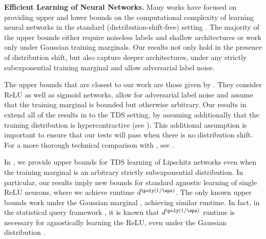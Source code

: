 \noindent\textbf{Efficient Learning of Neural Networks.} Many works have focused on providing upper and lower bounds on the computational complexity of learning neural networks in the standard (distribution-shift-free) setting \cite{reliable_goel2017,goel2019learning,goel2020superpolynomial,goel2020statistical,diakonikolas2020approximation,diakonikolas2020near,diakonikolas2020algorithms,diakonikolas2022learning,chen2022hardness,chen2022learning,chen2023learning,wang2023robustly,gollakota2024agnostically,diakonikolas2024efficiently,li2020learning,gao2019learning,zhang2019learning,vempala2019gradient,allen2019learning,bakshi2019learning,manurangsi2018computational,ge2019learning,ge2018learning,du2018convolutional,goel2018learning,tian2017analytical,li2017convergence,brutzkus2017globally,zhong2017recovery,zhang2016l1,janzamin2015beating}. The majority of the upper bounds either require noiseless labels and shallow architectures or work only under Gaussian training marginals. Our results not only hold in the presence of distribution shift, but also capture deeper architectures, under any strictly subexponential training marginal and allow adversarial label noise.

The upper bounds that are closest to our work are those given by \cite{reliable_goel2017}. They consider ReLU as well as sigmoid networks, allow for adversarial label noise and assume that the training marginal is bounded but otherwise arbitrary. Our results in  extend all of the results in \cite{reliable_goel2017} to the TDS setting, by assuming additionally that the training distribution is hypercontractive (see ). This additional assumption is important to ensure that our tests will pass when there is no distribution shift. For a more thorough technical comparison with \cite{reliable_goel2017}, see .

In , we provide upper bounds for TDS learning of Lipschitz networks even when the training marginal is an arbitrary strictly subexponential distribution. In particular, our results imply new bounds for standard agnostic learning of single ReLU neurons, where we achieve runtime $d^{\poly({1/\eps})}$. The only known upper bounds work under the Gaussian marginal \cite{diakonikolas2020approximation}, achieving similar runtime. In fact, in the statistical query  framework \cite{kearns1998efficient}, it is known that $d^{\poly(1/\eps)}$ runtime is necessary for agnostically learning the ReLU, even under the Gaussian distribution \cite{diakonikolas2020near,goel2020statistical}. 


